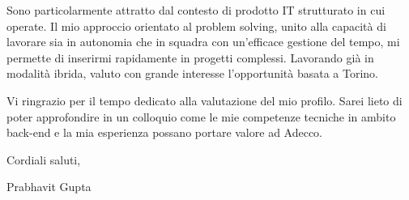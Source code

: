\documentclass[11pt,a4paper]{article}
\begin{document}
Sono particolarmente attratto dal contesto di prodotto IT strutturato in cui operate. Il mio approccio orientato al problem solving, unito alla capacità di lavorare sia in autonomia che in squadra con un'efficace gestione del tempo, mi permette di inserirmi rapidamente in progetti complessi. Lavorando già in modalità ibrida, valuto con grande interesse l'opportunità basata a Torino.

Vi ringrazio per il tempo dedicato alla valutazione del mio profilo. Sarei lieto di poter approfondire in un colloquio come le mie competenze tecniche in ambito back-end e la mia esperienza possano portare valore ad Adecco.

Cordiali saluti,

\vspace{2em}
Prabhavit Gupta
\end{document}
